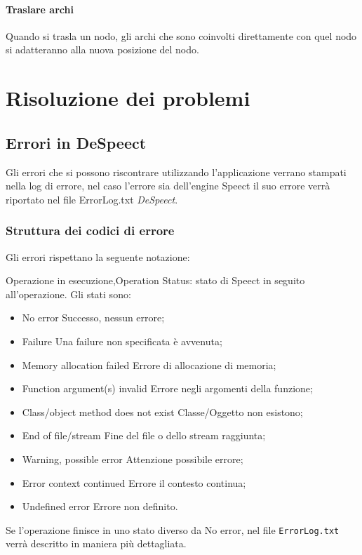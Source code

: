 \documentclass[openany,12pt,a4paper]{report}
\begin{document}
	\subsubsection{Traslare archi}
	Quando si trasla un nodo, gli archi che sono coinvolti direttamente con quel nodo si adatteranno alla nuova posizione del nodo.
	
	\chapter{Risoluzione dei problemi}
	
	\section{Errori in DeSpeect}
	Gli errori che si possono riscontrare utilizzando l’applicazione verrano stampati nella log di errore, nel caso l'errore sia dell'engine Speect il suo errore verrà riportato nel file ErrorLog.txt \textit{DeSpeect}.
	\subsection{Struttura dei codici di errore}
	Gli errori rispettano la seguente notazione:
	
	\begin{center}
		Operazione in esecuzione,Operation Status: stato di Speect in seguito all'operazione.
		Gli stati sono:
		\begin{itemize}
			\item {No error} Successo, nessun errore;
			\item {Failure} Una failure non specificata è avvenuta;
			\item {Memory allocation failed} Errore di allocazione di memoria;
			\item {Function argument(s) invalid} Errore negli argomenti della funzione;
			\item {Class/object method does not exist} Classe/Oggetto non esistono;
			\item {End of file/stream} Fine del file o dello stream raggiunta;
			\item {Warning, possible error} Attenzione possibile errore;
			\item {Error context continued} Errore il contesto continua;
			\item {Undefined error} Errore non definito.
		\end{itemize}
	 	Se l'operazione finisce in uno stato diverso da No error, nel file \verb|ErrorLog.txt| verrà descritto in maniera più dettagliata.
	\end{center}
	
\end{document}
